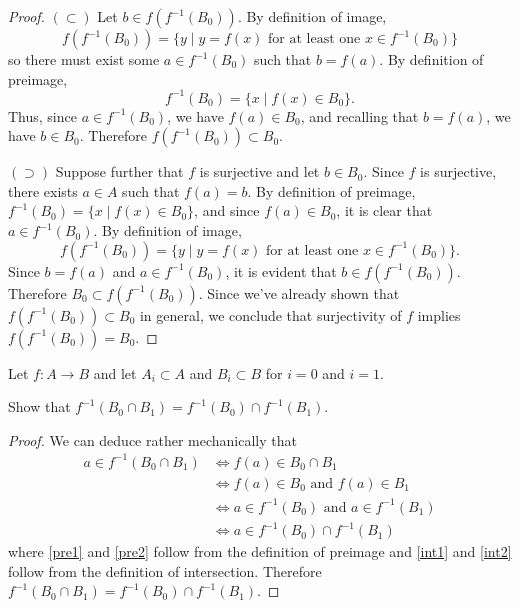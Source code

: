 \documentclass[11pt]{article}
\newenvironment{ex}[2][Exercise]{
  \begin{trivlist}
    \item[\hskip \labelsep {\bfseries #1}\hskip \labelsep {\bfseries #2.}]}
  {\end{trivlist}}
\newenvironment{p}[1]{
  \begin{trivlist}
\item[\hskip \labelsep {\bfseries (#1)}]}
  {\end{trivlist}}
\begin{document}
\begin{proof}
  $(\subset)$ Let $b \in f(f^{-1}(B_0))$. By definition of image,
  $$f(f^{-1}(B_0)) = \{ y \mid y = f(x) \text{ for at least one } x \in f^{-1}(B_0)\}$$
  so there must exist some $a \in f^{-1}(B_0)$ such that $b = f(a)$.
  By definition of preimage,
  $$ f^{-1}(B_0) = \{ x \mid f(x) \in B_0 \}.$$
  Thus, since $ a \in f^{-1}(B_0)$, we have $f(a) \in B_0$, and recalling that
  $b = f(a)$, we have $b \in B_0$. Therefore $f(f^{-1}(B_0)) \subset B_0$.

  $(\supset)$ Suppose further that $f$ is surjective and let $b \in B_0$. Since
  $f$ is surjective, there exists $a \in A$ such that $f(a) = b$. By definition
  of preimage, $f^{-1}(B_0) = \{ x \mid f(x) \in B_0 \}$, and since $f(a) \in
  B_0$, it is clear that $a \in f^{-1}(B_0)$. By definition of image,
  $$ f(f^{-1}(B_0)) = \{ y \mid y = f(x) \text{ for at least one } x \in f^{-1}(B_0) \}.$$
  Since $b = f(a)$ and $a \in f^{-1}(B_0)$, it is evident that $b \in
  f(f^{-1}(B_0))$. Therefore $B_0 \subset f(f^{-1}(B_0))$. Since we've already
  shown that $f(f^{-1}(B_0)) \subset B_0$ in general, we conclude that
  surjectivity of $f$ implies $f(f^{-1}(B_0)) = B_0$.

\end{proof}

\begin{ex}{2.2}
  Let $f: A \to B$ and let $A_i \subset A$ and $B_i \subset B$ for $i=0$ and $i=1$.
\end{ex}

\begin{p}{c}
  Show that $f^{-1}(B_0 \cap B_1) = f^{-1}(B_0) \cap f^{-1}(B_1)$.
\end{p}

\begin{proof}
  We can deduce rather mechanically that
  \begin{align}
    a \in f^{-1}(B_0 \cap B_1)
      &\iff f(a) \in B_0 \cap B_1 \label{pre1} \\
      &\iff f(a) \in B_0 \text{ and } f(a) \in B_1 \label{int1} \\
      &\iff a \in f^{-1}(B_0) \text{ and } a \in f^{-1}(B_1) \label{pre2} \\
      &\iff a \in f^{-1}(B_0) \cap f^{-1}(B_1) \label{int2}
  \end{align}
  where \eqref{pre1} and \eqref{pre2} follow from the definition of preimage and
  \eqref{int1} and \eqref{int2} follow from the definition of intersection. Therefore
  $f^{-1}(B_0 \cap B_1) = f^{-1}(B_0) \cap f^{-1}(B_1)$.
\end{proof}
\end{document}
